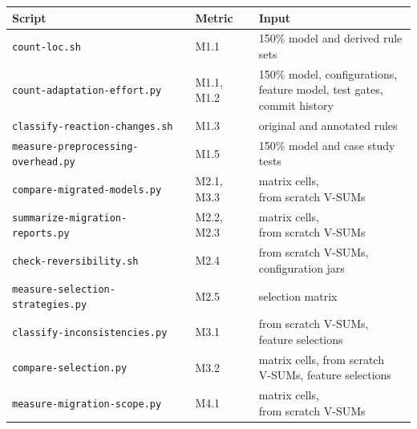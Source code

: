 \begin{table}[htbp]
    \centering
    \begin{tabular}{|l|l|l|}
        \hline
        \textbf{Script}                            & \textbf{Metric} & \textbf{Input}                            \\
        \hline
        \texttt{count-loc.sh}                      & M1.1            & 150\% model and derived rule sets         \\
        \hline
        \texttt{count-adaptation-effort.py}        & M1.1, M1.2      & \makecell[l]{150\% model, configurations, \\ feature model, test gates, \\ commit history} \\
        \hline
        \texttt{classify-reaction-changes.sh}      & M1.3            & original and annotated rules              \\
        \hline
        \texttt{measure-preprocessing-overhead.py} & M1.5            & 150\% model and case study tests          \\
        \hline
        \texttt{compare-migrated-models.py}        & M2.1, M3.3      & \makecell[l]{matrix cells,                \\ from scratch V-SUMs} \\
        \hline
        \texttt{summarize-migration-reports.py}    & M2.2, M2.3      & \makecell[l]{matrix cells,                \\ from scratch V-SUMs} \\
        \hline
        \texttt{check-reversibility.sh}            & M2.4            & \makecell[l]{from scratch V-SUMs,         \\ configuration jars} \\
        \hline
        \texttt{measure-selection-strategies.py}   & M2.5            & selection matrix                          \\
        \hline
        \texttt{classify-inconsistencies.py}       & M3.1            & \makecell[l]{from scratch V-SUMs,         \\ feature selections} \\
        \hline
        \texttt{compare-selection.py}              & M3.2            & \makecell[l]{matrix cells, from scratch   \\ V-SUMs, feature selections} \\
        \hline
        \texttt{measure-migration-scope.py}        & M4.1            & \makecell[l]{matrix cells,                \\ from scratch V-SUMs} \\

\end{tabular}
\end{table}
